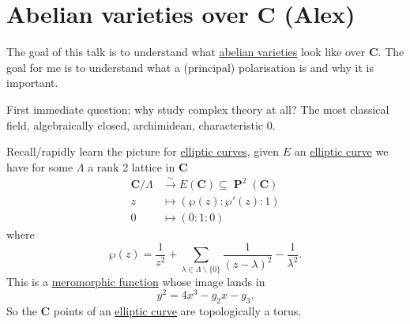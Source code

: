\documentclass[10pt,]{book}
\numberwithin{equation}{section}
\newcommand{\CC}{\mathbf{C}}
\DeclareMathOperator{\PP}{\mathbf{P}}
\newcommand{\amp}{&}
\begin{document}
\section[{Abelian varieties over \(\CC\) (Alex)}]{Abelian varieties over \(\CC\) (Alex)}\label{sec-av-complex}
\hypertarget{p-37}{}%
The goal of this talk is to understand what \hyperref[def-buntes-abvar]{abelian varieties} look like over \(\CC\). The goal for me is to understand what a (principal) polarisation is and why it is important.%
\par
\hypertarget{p-38}{}%
First immediate question: why study complex theory at all? The most classical field, algebraically closed, archimidean, characteristic 0.%
\par
\hypertarget{p-39}{}%
Recall/rapidly learn the picture for \hyperref[def-supersing-isog-ec]{elliptic curves}, given \(E\) an \hyperref[def-supersing-isog-ec]{elliptic curve} we have for some \(\Lambda\) a rank 2 lattice in \(\CC\)%
\begin{align*}
\CC/\Lambda \amp\xrightarrow{\sim} E(\CC) \subseteq \PP^2(\CC)\\
z\amp\mapsto (\wp(z) : \wp'(z) : 1)\\
0\amp\mapsto (0 : 1 : 0)
\end{align*}
where%
\begin{equation*}
\wp(z) = \frac{1}{z^2} + \sum_{\lambda \in \Lambda\smallsetminus\{0\}} \frac{1}{(z-\lambda)^2} - \frac{1}{\lambda^2}\text{.}
\end{equation*}
This is a \hyperref[def-morph-riem-surf]{meromorphic function} whose image lands in%
\begin{equation*}
y^2 = 4x^3 - g_2 x - g_3\text{.}
\end{equation*}
So the \(\CC\) points of an \hyperref[def-supersing-isog-ec]{elliptic curve} are topologically a torus.%
%
%
\typeout{************************************************}
\typeout{************************************************}
%
\end{document}
